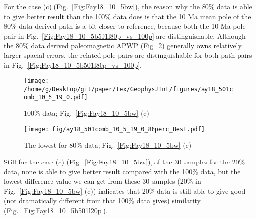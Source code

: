For the case (c) (Fig.~\ref{Fig:Fay18_10_5bw}), the reason why the 80\% data is
able to give better result than the 100\% data does is that the 10 Ma mean pole
of the 80\% data derived path is a bit closer to reference, because both the 10
Ma pole pair in Fig.~\ref{Fig:Fay18_10_5b501l80p_vs_100p} are distinguishable.
Although the 80\% data derived paleomagnetic APWP
(Fig.~\ref{Fig:Fay18_10_5b501l80p}) generally owns relatively larger spacial
errors, the related pole pairs are distinguishable for both path pairs in
Fig.~\ref{Fig:Fay18_10_5b501l80p_vs_100p}.

\begin{figure*}[tbp]
  \captionsetup[subfigure]{labelformat=empty,aboveskip=-6pt,belowskip=-6pt}
  \centering
  \begin{subfigure}[htbp]{.49\textwidth}
    \captionsetup{skip=0pt}
    \centering
    \texttt{[image: /home/g/Desktop/git/paper/tex/GeophysJInt/figures/ay18\_501comb\_10\_5\_19\_0.pdf]}
	\caption{100\% data; Fig.~\ref{Fig:Fay18_10_5bw}
	(c)}\label{Fig:Fay18_10_5b501}
  \end{subfigure}
  \begin{subfigure}[htbp]{.49\textwidth}
    \captionsetup{skip=0pt}
    \centering
    \texttt{[image: fig/ay18\_501comb\_10\_5\_19\_0\_80perc\_Best.pdf]}  %
    \caption{The lowest for 80\% data;
	Fig.~\ref{Fig:Fay18_10_5bw} (c)}\label{Fig:Fay18_10_5b501l80p}
  \end{subfigure}
  \caption[Less data, better similarity?]{Comparing the 100\% Indian
  120 Ma paleomagnetic data derived result with the best of the only
  80\% data (giving even better similarity) derived results (the green dot in
  Fig.~\ref{Fig:Fay18_10_5bw} (c)).}\label{Fig:Fay18_10_5b501l80p_vs_100p}
\end{figure*}

Still for the case (c) (Fig.~\ref{Fig:Fay18_10_5bw}), of the 30 samples for the
20\% data, none is able to give better result compared with the 100\% data, but
the lowest difference value we can get from these 30 samples (20\% in
Fig.~\ref{Fig:Fay18_10_5bw} (c)) indicates that 20\% data is still able to give
good (not dramatically different from that 100\% data gives) similarity
(Fig.~\ref{Fig:Fay18_10_5b501l20p}).


